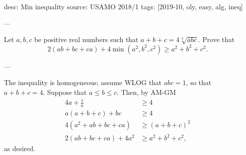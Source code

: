 desc: Min inequality
source: USAMO 2018/1
tags: [2019-10, oly, easy, alg, ineq]

---

Let $a,b,c$ be positive real numbers such that $a+b+c=4\sqrt[3]{abc}$. Prove that \[2(ab+bc+ca)+4\min(a^2,b^2,c^2)\ge a^2+b^2+c^2.\]

---

The inequality is homogeneous; assume WLOG that $abc=1$, so that $a+b+c=4$. Suppose that $a\le b\le c$. Then, by AM-GM
\begin{align*}
    4a+\frac1a&\ge 4\\
    a(a+b+c)+bc&\ge 4\\
    4(a^2+ab+bc+ca)&\ge (a+b+c)^2\\
    2(ab+bc+ca)+4a^2&\ge a^2+b^2+c^2,
\end{align*}
as desired.
